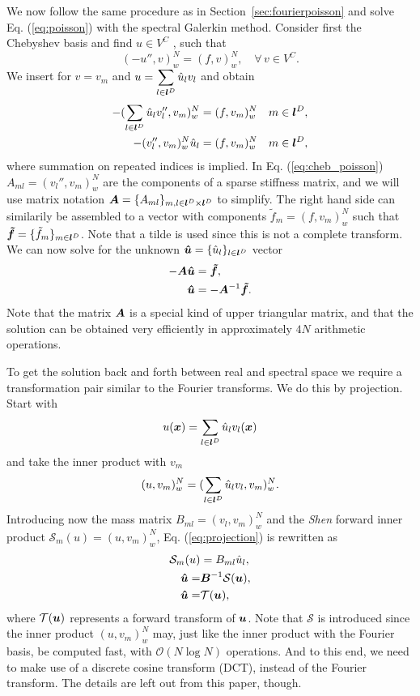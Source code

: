 \documentclass[%
oneside,                 %
final,                   %
10pt]{article}
\theoremstyle{definition}
\begin{document}
We now follow the same procedure as in Section~\ref{sec:fourierpoisson} and solve Eq. (\ref{eq:poisson}) with the spectral Galerkin method. Consider first the Chebyshev basis and find $u \in V^C$ , such that
\begin{equation}
(-u'', v)_w^N = (f, v)_w^N , \quad \forall \, v \in V^C.
\end{equation}
We insert for $v=v_m$ and $u=\displaystyle \sum_{l\in \boldsymbol{l}^D} \hat{u}_l v_l$ and obtain
\begin{align}
-(\sum_{l\in \boldsymbol{l}^D} \hat{u}_l v_l'', v_m)_w^N &= (f, v_m)_w^N  &m \in \boldsymbol{l}^D,\\ 
-(v_l'', v_m)_w^N \hat{u}_l &= (f, v_m)_w^N & m \in \boldsymbol{l}^D, \label{eq:cheb_poisson}
\end{align}
where summation on repeated indices is implied. In Eq. (\ref{eq:cheb_poisson}) $A_{ml} =(v_l'', v_m)_w^N$ are the components of a sparse stiffness matrix, and we will use matrix notation $\boldsymbol{A} = \{A_{ml}\}_{m,l \in \boldsymbol{l}^D \times \boldsymbol{l}^D}$ to simplify. The right hand side can similarily be assembled to a vector with components $\tilde{f}_m = (f, v_m)_w^N$ such that $\boldsymbol{\tilde{f}} = \{\tilde{f}_m\}_{m\in \boldsymbol{l}^D} $. Note that a tilde is used since this is not a complete transform. We can now solve for the unknown $\boldsymbol{\hat{u}} = \{\hat{u}_l\}_{l\in \boldsymbol{l}^D}$ vector
\begin{align}
-\boldsymbol{A} \boldsymbol{\hat{u}} &= \boldsymbol{\tilde{f}}, \\ 
   \boldsymbol{\hat{u}} &= -\boldsymbol{A}^{-1} \boldsymbol{\tilde{f}}.
\end{align}
Note that the matrix $\boldsymbol{A}$ is a special kind of upper triangular matrix, and that the solution can be obtained very efficiently in approximately $4 N$ arithmetic operations. 

To get the solution back and forth between real and spectral space we require a transformation pair similar to the Fourier transforms. We do this by projection. Start with
\begin{equation}
u(\boldsymbol{x}) = \sum_{l\in \boldsymbol{l}^D} \hat{u}_l v_l(\boldsymbol{x})
\end{equation}
and take the inner product with $v_m$
\begin{equation}
(u, v_m)_w^N  = (\sum_{l\in \boldsymbol{l}^D} \hat{u}_l v_l, v_m)_w^N.
\label{eq:projection}
\end{equation}
Introducing now the mass matrix $B_{ml} = (v_l, v_m)_w^N$ and the \emph{Shen} forward inner product $\mathcal{S}_m(u) = (u, v_m)_w^N$, Eq. (\ref{eq:projection})  is rewritten as
\begin{align}
\mathcal{S}_m(u) &= B_{ml} \hat{u}_l, \\ 
\boldsymbol{\hat{u}}  =& \boldsymbol{B}^{-1} \mathcal{S}(\boldsymbol{u}) , \\ 
\boldsymbol{\hat{u}}  =& \mathcal{T}(\boldsymbol{u}) ,
\end{align}
where $\mathcal{T}(\boldsymbol{u})$ represents a forward transform of $\boldsymbol{u}$. Note that $\mathcal{S}$ is introduced since the inner product $(u, v_m)_w^N$ may, just like the inner product with the Fourier basis, be computed fast, with $\mathcal{O}(N \log N)$ operations. And to this end, we need to make use of a discrete cosine transform (DCT), instead of the Fourier transform. The details are left out from this paper, though.
\end{document}
